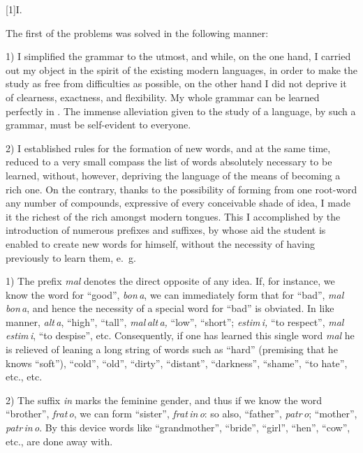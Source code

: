 \documentclass[12pt,twoside]{book}
\begin{document}
\vspace{12pt}

{\hfil \scalebox{2}[1]{\large\cowboyfont I.}}
{}

\vspace{12pt}

The first of the problems was solved in the following manner:

1) I simplified the grammar to the utmost, and while, on the one hand, I carried out my object in the spirit of the existing modern languages, in order to make the study as free from difficulties as possible, on the other hand I did not deprive it of clearness, exactness, and flexibility. My whole grammar can be learned perfectly in . The immense alleviation given to the study of a language, by such a grammar, must be self-evident to everyone.

2) I established rules for the formation of new words, and at the same time, reduced to a very small compass the list of words absolutely necessary to be learned, without, however, depriving the language of the means of becoming a rich one. On the contrary, thanks to the possibility of forming from one root-word any number of compounds, expressive of every conceivable shade of idea, I made it the richest of the rich amongst modern tongues. This I accomplished by the introduction of numerous prefixes and suffixes, by whose aid the student is enabled to create new words for himself, without the necessity of having previously to learn them, e.~g.

1) The prefix \emph{mal} denotes the direct opposite of any idea. If, for instance, we know the word for “good”, \emph{bon\,a}, we can immediately form that for “bad”, \emph{mal\,bon\,a}, and hence the necessity of a special word for “bad” is obviated. In like manner, \emph{alt\,a}, “high”, “tall”, \emph{mal\,alt\,a,} “low”, “short”; \emph{estim\,i,} “to respect”, \emph{mal\,estim\,i}, “to despise”, etc. Consequently, if one has learned this single word \emph{mal} he is relieved of leaning a long string of words such as “hard” (premising that he knows “soft”), “cold”, “old”, “dirty”, “distant”, “darkness”, “shame”, “to hate”, etc., etc.

2) The suffix \emph{in} marks the feminine gender, and thus if we know the word “brother”, \emph{frat\,o}, we can form “sister”, \emph{frat\,in\,o}: so also, “father”, \emph{patr\,o}; “mother”, \emph{patr\,in\,o}. By this device words like “grandmother”, “bride”, “girl”, “hen”, “cow”, etc., are done away with.
\end{document}

